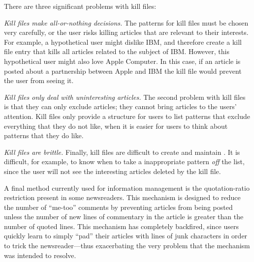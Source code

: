 There are three significant problems with kill files:
\begin {itemizenoindent}
\item {\em Kill files make all-or-nothing decisions.} The patterns for kill
  files must be chosen very carefully, or the user risks killing articles
  that are relevant to their interests. For example, a hypothetical user
  might dislike IBM, and therefore create a kill file entry that kills all
  articles related to the subject of IBM.  However, this hypothetical user
  might also love Apple Computer. In this case, if an article is posted about
  a partnership between Apple and IBM the kill file would prevent the user
  from seeing it.
  
\item {\em Kill files only deal with uninteresting articles.} The second
  problem with kill files is that they can only exclude articles; they cannot
  bring articles to the users' attention. Kill files only provide a structure
  for users to list patterns that exclude everything that they do not like,
  when it is easier for users to think about patterns that they do like.
  
\item {\em Kill files are brittle.} Finally, kill files are
  difficult to create and maintain \cite{cacm-infoscope-92}.  It is difficult,
  for example, to know when to take a inappropriate pattern {\em off} the list,
  since the user will not see the interesting articles deleted by the kill
  file.

\end {itemizenoindent}

A final method currently used for information management is the quotation-ratio
restriction present in some newsreaders.  This mechanism is designed to
reduce the number of ``me-too'' comments by preventing articles from being
posted unless the number of new lines of commentary in the article is
greater than the number of quoted lines.  This mechanism has completely
backfired, since users quickly learn to simply ``pad'' their articles with
lines of junk characters in order to trick the newsreader---thus
exacerbating the very problem that the mechanism was intended to resolve.







